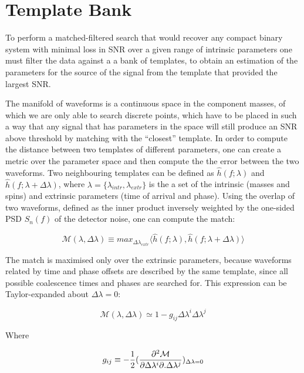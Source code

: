 \documentclass[binding=0.6cm, LaM]{sapthesis}
\begin{document}
%

\section{Template Bank}


	To perform a matched-filtered search that would recover any compact binary system 	
	with minimal loss in SNR over a given range of intrinsic parameters 
	one must filter the data against a a bank of templates, 
	to obtain an estimation of the parameters for the source of the signal 
	from the template that provided the largest SNR.
	

	The manifold of waveforms is a continuous space in the component masses, 
	of which we are only able to search discrete points, 
	which have to be placed in such a way that any signal
	that has parameters in the space will still produce an SNR 
	above threshold by matching with the “closest” template. 
	In order to compute the distance between two templates of different parameters, 
	one can create a metric over the parameter space and then compute the the error between the two waveforms.
	Two neighbouring templates can be defined as $\hat h(f;\lambda)$ and $\hat h(f;\lambda + \Delta \lambda)$,
	where $\lambda = \{\lambda_{intr}, \lambda_{extr}\}$ is the a set of 
	the intrinsic (masses and spins) and extrinsic parameters (time of arrival and phase).
	Using the overlap of two waveforms, defined as the inner product inversely weighted 
	by the one-sided PSD $S_n(f)$ of the detector noise, one can compute the match:

		\begin{equation}
			\mathcal{M}(\lambda, \Delta \lambda) \equiv max_{\Delta \lambda_{extr}} \langle\hat h(f;\lambda), \hat h(f;\lambda + \Delta \lambda)  \rangle
		\end{equation}

	The match is maximised only over the extrinsic parameters, 
	because waveforms related by time and phase offsets
	are described by the same template, 
	since all possible coalescence times and phases are searched for.
	This expression can be Taylor-expanded about $\Delta \lambda = 0$:

		\begin{equation}
			\mathcal{M}(\lambda, \Delta \lambda) \simeq 1 - g_{ij} \Delta \lambda^i \Delta \lambda^j
		\end{equation}

	Where 

		\begin{equation}
			 g_{ij} \equiv -{1 \over 2} ({{\partial^2\mathcal{M}} \over {\partial  \Delta \lambda^i  \partial. \Delta \lambda^j}})_{\Delta \lambda = 0}
		\end{equation}
\end{document}
